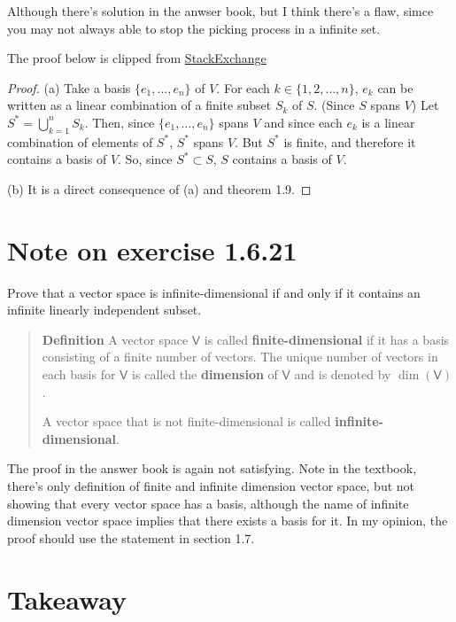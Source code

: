 \documentclass{article}
\newcommand{\0}{\mathit{0}}
\begin{document}
Although there's solution in the anwser book, but I think there's a flaw, simce you
may not always able to stop the picking process in a infinite set.

The proof below is clipped from \href{https://math.stackexchange.com/a/4762926/808819}{StackExchange}

\begin{proof}
    (a)
    Take a basis  $\{e_1,\ldots,e_n\}$ of $V$.
    For each $k\in\{1,2,\ldots,n\}$, $e_k$ can be written as a linear
    combination of a finite subset $S_k$ of $S$. (Since $S$ spans $V$)
    Let $S^\ast=\bigcup_{k=1}^nS_k$.
    Then, since $\{e_1,\ldots,e_n\}$ spans $V$ and
    since each $e_k$ is a linear combination of elements of $S^\ast$,
    $S^\ast$ spans $V$. But $S^\ast$ is finite, and therefore it contains a basis of $V$.
    So, since $S^\ast\subset S$, $S$ contains a basis of $V$.

    (b) It is a direct consequence of (a) and theorem 1.9.
\end{proof}

\section{Note on exercise 1.6.21}
Prove that a vector space is infinite-dimensional if and only if it contains
an infinite linearly independent subset.

\begin{quotation}
    \textbf{Definition}
    A vector space $\mathsf{V}$ is called \textbf{finite-dimensional} if it has a basis
    consisting of a finite number of vectors. The unique number of vectors in each
    basis for $\mathsf{V}$ is called the \textbf{dimension} of $\mathsf{V}$ and is denoted
    by $\dim(\mathsf{V})$.

    A vector space that is not finite-dimensional is called \textbf{infinite-dimensional}.
\end{quotation}

The proof in the answer book is again not satisfying. Note in the textbook, there's only
definition of finite and infinite dimension vector space, but not showing that every vector
space has a basis, although the name of infinite dimension vector space implies that
there exists a basis for it. In my opinion, the proof should use the statement in section 1.7.

\newpage

\section{Takeaway}
\end{document}

